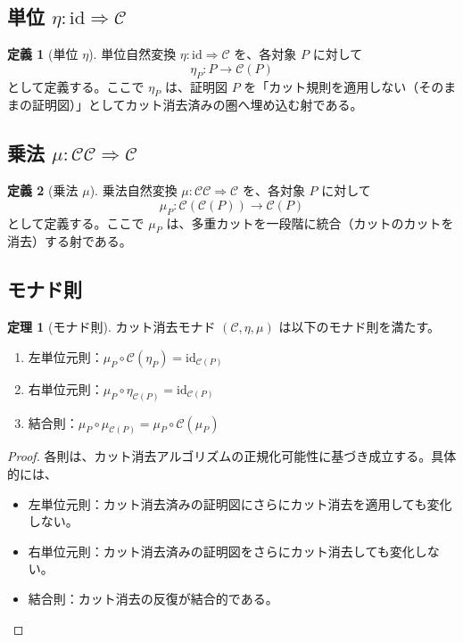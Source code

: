 \documentclass[11pt,a4paper]{article}
\theoremstyle{definition}
\newtheorem{definition}{定義}[section]
\newtheorem{theorem}{定理}[section]
\newcommand{\monad}{\mathcal{C}}
\newcommand{\id}{\mathrm{id}}
\begin{document}
\subsection{単位 $\eta : \id \Rightarrow \monad$}

\begin{definition}[単位 $\eta$]
単位自然変換 $\eta : \id \Rightarrow \monad$ を、各対象 $P$ に対して
\[
\eta_P : P \to \monad(P)
\]
として定義する。ここで $\eta_P$ は、証明図 $P$ を「カット規則を適用しない（そのままの証明図）」としてカット消去済みの圏へ埋め込む射である。
\end{definition}

\subsection{乗法 $\mu : \monad \monad \Rightarrow \monad$}

\begin{definition}[乗法 $\mu$]
乗法自然変換 $\mu : \monad \monad \Rightarrow \monad$ を、各対象 $P$ に対して
\[
\mu_P : \monad(\monad(P)) \to \monad(P)
\]
として定義する。ここで $\mu_P$ は、多重カットを一段階に統合（カットのカットを消去）する射である。
\end{definition}

\subsection{モナド則}

\begin{theorem}[モナド則]
カット消去モナド $(\monad, \eta, \mu)$ は以下のモナド則を満たす。
\begin{enumerate}
  \item 左単位元則：$\mu_P \circ \monad(\eta_P) = \id_{\monad(P)}$
  \item 右単位元則：$\mu_P \circ \eta_{\monad(P)} = \id_{\monad(P)}$
  \item 結合則：$\mu_P \circ \mu_{\monad(P)} = \mu_P \circ \monad(\mu_P)$
\end{enumerate}
\end{theorem}

\begin{proof}
各則は、カット消去アルゴリズムの正規化可能性に基づき成立する。具体的には、
\begin{itemize}
  \item 左単位元則：カット消去済みの証明図にさらにカット消去を適用しても変化しない。
  \item 右単位元則：カット消去済みの証明図をさらにカット消去しても変化しない。
  \item 結合則：カット消去の反復が結合的である。
\end{itemize}
\end{proof}
\end{document}
